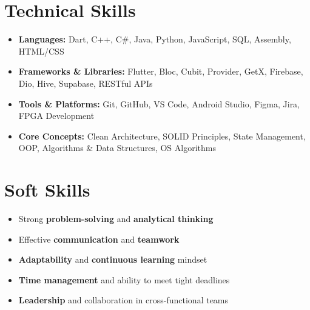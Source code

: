\documentclass[10pt, letterpaper]{article}
\newenvironment{highlights}{
\begin{itemize}[
topsep=0.10 cm,
parsep=0.10 cm,
partopsep=0pt,
itemsep=0pt,
leftmargin=0 cm + 10pt
]
}{
\end{itemize}
} %
\begin{document}
\vspace{0.2 cm}


\section{Technical Skills}
\vspace{0.1cm}

\begin{highlights}
\item \textbf{Languages:} Dart, C++, C\#, Java, Python, JavaScript, SQL, Assembly, HTML/CSS
\item \textbf{Frameworks \& Libraries:} Flutter, Bloc, Cubit, Provider, GetX, Firebase, Dio, Hive, Supabase, RESTful APIs
\item \textbf{Tools \& Platforms:} Git, GitHub, VS Code, Android Studio, Figma, Jira, FPGA Development
\item \textbf{Core Concepts:} Clean Architecture, SOLID Principles, State Management, OOP, Algorithms \& Data Structures, OS Algorithms
\end{highlights}

\section{Soft Skills}
\vspace{0.1cm}

\begin{highlights}
\item Strong \textbf{problem-solving} and \textbf{analytical thinking}
\item Effective \textbf{communication} and \textbf{teamwork}
\item \textbf{Adaptability} and \textbf{continuous learning} mindset
\item \textbf{Time management} and ability to meet tight deadlines
\item \textbf{Leadership} and collaboration in cross-functional teams
\end{highlights}
\end{document}

